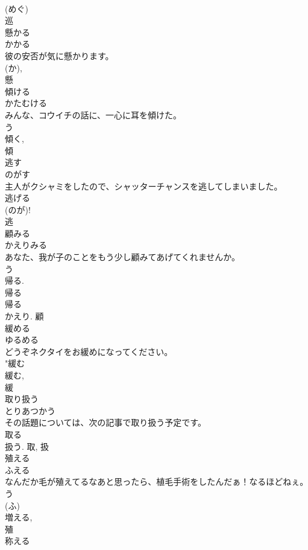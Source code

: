 \documentclass[8pt]{extreport}
\begin{document}
\begin{CJK}{UTF8}{min}
\\	(めぐ) 
\\	巡	
\\	懸かる	
\\	かかる	
\\	彼の安否が気に懸かります。	
\\	(か), 
\\	懸	
\\	傾ける	
\\	かたむける	
\\	みんな、コウイチの話に、一心に耳を傾けた。	
\\	う 
\\	傾く, 
\\	傾	
\\	逃す	
\\	のがす	
\\	主人がクシャミをしたので、シャッターチャンスを逃してしまいました。	
\\	逃げる 
\\	(のが)! 
\\	逃	
\\	顧みる	
\\	かえりみる	
\\	あなた、我が子のことをもう少し顧みてあげてくれませんか。	
\\	う 
\\	帰る. 
\\	帰る 
\\	帰る 
\\	かえり.	顧	
\\	緩める	
\\	ゆるめる	
\\	どうぞネクタイをお緩めになってください。	
\\	"緩む 
\\	緩む, 
\\	緩	
\\	取り扱う	
\\	とりあつかう	
\\	その話題については、次の記事で取り扱う予定です。	
\\	取る 
\\	扱う.	取, 扱	
\\	殖える	
\\	ふえる	
\\	なんだか毛が殖えてるなあと思ったら、植毛手術をしたんだぁ！なるほどねぇ。	
\\	う 
\\	(ふ) 
\\	増える, 
\\	殖	
\\	称える	

\end{CJK}
\end{document}
